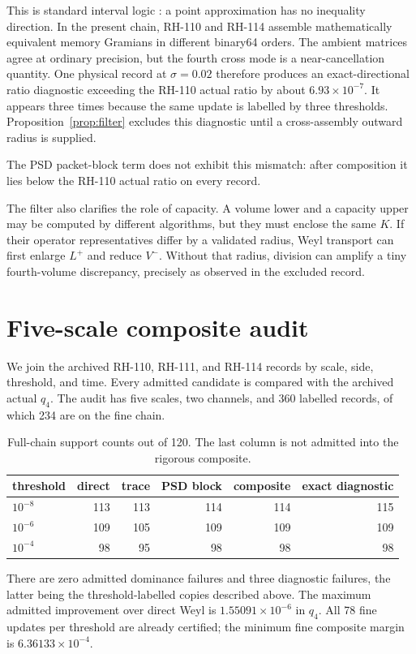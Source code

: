 \documentclass[12pt]{article}
\begin{document}
This is standard interval logic \citep{Moore1966}: a point approximation has
no inequality direction.  In the present chain, RH-110 and RH-114 assemble
mathematically equivalent memory Gramians in different binary64 orders.  The
ambient matrices agree at ordinary precision, but the fourth cross mode is a
near-cancellation quantity.  One physical record at $\sigma=0.02$ therefore
produces an exact-directional ratio diagnostic exceeding the RH-110 actual
ratio by about $6.93\times10^{-7}$.  It appears three times because the same
update is labelled by three thresholds.  Proposition~\ref{prop:filter}
excludes this diagnostic until a cross-assembly outward radius is supplied.

The PSD packet-block term does not exhibit this mismatch: after composition
it lies below the RH-110 actual ratio on every record.

The filter also clarifies the role of capacity.  A volume lower and a capacity
upper may be computed by different algorithms, but they must enclose the same
$K$.  If their operator representatives differ by a validated radius, Weyl
transport can first enlarge $L^+$ and reduce $V^-$.  Without that radius,
division can amplify a tiny fourth-volume discrepancy, precisely as observed
in the excluded record.

\section{Five-scale composite audit}
We join the archived RH-110, RH-111, and RH-114 records by scale, side,
threshold, and time.  Every admitted candidate is compared with the archived
actual $q_4$.  The audit has five scales, two channels, and 360 labelled
records, of which 234 are on the fine chain.

\begin{table}[h]
\centering\begin{tabular}{lrrrrr}\toprule
threshold & direct & trace & PSD block & composite & exact diagnostic\\\midrule
$10^{-8}$&113&113&114&114&115\\
$10^{-6}$&109&105&109&109&109\\
$10^{-4}$&98&95&98&98&98\\\bottomrule
\end{tabular}
\caption{Full-chain support counts out of 120.  The last column is not
admitted into the rigorous composite.}
\end{table}

There are zero admitted dominance failures and three diagnostic failures,
the latter being the threshold-labelled copies described above.  The maximum
admitted improvement over direct Weyl is $1.55091\times10^{-6}$ in $q_4$.
All 78 fine updates per threshold are already certified; the minimum fine
composite margin is $6.36133\times10^{-4}$.
\end{document}
